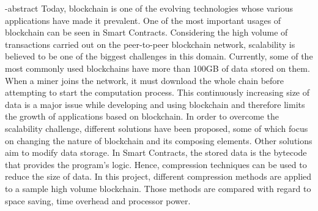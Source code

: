 
\en-abstract{
	Today, blockchain is one of the evolving technologies whose various applications have made it prevalent. One of the most important usages of blockchain can be seen in Smart Contracts. Considering the high volume of transactions carried out on the peer-to-peer blockchain network, scalability is believed to be one of the biggest challenges in this domain. Currently, some of the most commonly used blockchains have more than 100GB of data stored on them. When a miner joins the network, it must download the whole chain before attempting to start the computation process. This continuously increasing size of data is a major issue while developing and using blockchain and therefore limits the growth of applications based on blockchain. In order to overcome the scalability challenge, different solutions have been proposed, some of which focus on changing the nature of blockchain and its composing elements. Other solutions aim to modify data storage. In Smart Contracts, the stored data is the bytecode that provides the program's logic. Hence, compression techniques can be used to reduce the size of data. In this project, different compression methods are applied to a sample high volume blockchain. Those methods are compared with regard to space saving, time overhead and processor power.
}
